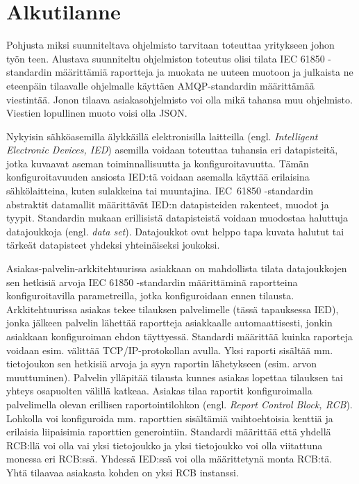 \chapter{Alkutilanne}
\label{ch:alkutilanne}

\begin{it}
	Pohjusta miksi suunniteltava ohjelmisto tarvitaan toteuttaa yritykseen johon työn teen. Alustava suunniteltu ohjelmiston toteutus olisi tilata IEC 61850 -standardin määrittämiä raportteja ja muokata ne uuteen muotoon ja julkaista ne eteenpäin tilaavalle ohjelmalle käyttäen AMQP-standardin määrittämää viestintää. Jonon tilaava asiakasohjelmisto voi olla mikä tahansa muu ohjelmisto. Viestien lopullinen muoto voisi olla JSON.
\end{it}

Nykyisin sähköasemilla älykkäillä elektronisilla laitteilla (engl. \emph{Intelligent Electronic Devices, IED}) asemilla voidaan toteuttaa tuhansia eri datapisteitä, jotka kuvaavat aseman toiminnallisuutta ja konfiguroitavuutta. Tämän konfiguroitavuuden ansiosta IED:tä voidaan asemalla käyttää erilaisina sähkölaitteina, kuten sulakkeina tai muuntajina. IEC~61850 -standardin abstraktit datamallit määrittävät IED:n datapisteiden rakenteet, muodot ja tyypit. Standardin mukaan erillisistä datapisteistä voidaan muodostaa haluttuja datajoukkoja (engl. \emph{data set}). Datajoukkot ovat helppo tapa kuvata halutut tai tärkeät datapisteet yhdeksi yhteinäiseksi joukoksi. \mbox{\cite{Mackiewicz2006}}

Asiakas-palvelin-arkkitehtuurissa asiakkaan on mahdollista tilata datajoukkojen sen hetkisiä arvoja IEC 61850 -standardin määrittäminä raportteina konfiguroitavilla parametreilla, jotka konfiguroidaan ennen tilausta. Arkkitehtuurissa asiakas tekee tilauksen palvelimelle (tässä tapauksessa IED), jonka jälkeen palvelin lähettää raportteja asiakkaalle automaattisesti, jonkin asiakkaan konfiguroiman ehdon täyttyessä. Standardi määrittää kuinka raporteja voidaan esim. välittää TCP/IP-protokollan avulla. Yksi raporti sisältää mm. tietojoukon sen hetkisiä arvoja ja syyn raportin lähetykseen (esim. arvon muuttuminen). Palvelin ylläpitää tilausta kunnes asiakas lopettaa tilauksen tai yhteys osapuolten välillä katkeaa. Asiakas tilaa raportit konfiguroimalla palvelimella olevan erillisen raportointilohkon (engl. \emph{Report Control Block, RCB}). Lohkolla voi konfiguroida mm. raporttien sisältämiä vaihtoehtoisia kenttiä ja erilaisia liipaisimia raporttien generointiin. Standardi määrittää että yhdellä RCB:llä voi olla vai yksi tietojoukko ja yksi tietojoukko voi olla viitattuna monessa eri RCB:ssä. Yhdessä IED:ssä voi olla määrittetynä monta RCB:tä. Yhtä tilaavaa asiakasta kohden on yksi RCB instanssi. \mbox{\cite[s.~91--130]{IEC61850-7-2}}

